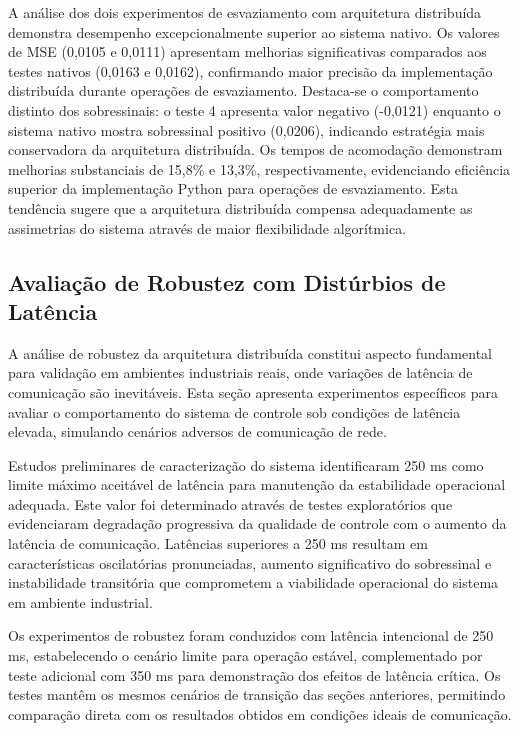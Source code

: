 A análise dos dois experimentos de esvaziamento com arquitetura distribuída demonstra desempenho excepcionalmente superior ao sistema nativo. Os valores de MSE (0,0105 e 0,0111) apresentam melhorias significativas comparados aos testes nativos (0,0163 e 0,0162), confirmando maior precisão da implementação distribuída durante operações de esvaziamento. Destaca-se o comportamento distinto dos sobressinais: o teste 4 apresenta valor negativo (-0,0121) enquanto o sistema nativo mostra sobressinal positivo (0,0206), indicando estratégia mais conservadora da arquitetura distribuída. Os tempos de acomodação demonstram melhorias substanciais de 15,8\% e 13,3\%, respectivamente, evidenciando eficiência superior da implementação Python para operações de esvaziamento. Esta tendência sugere que a arquitetura distribuída compensa adequadamente as assimetrias do sistema através de maior flexibilidade algorítmica.

\subsection{Avaliação de Robustez com Distúrbios de Latência}
\label{sec:fuzzydistribuidolatencia}

A análise de robustez da arquitetura distribuída constitui aspecto fundamental para validação em ambientes industriais reais, onde variações de latência de comunicação são inevitáveis. Esta seção apresenta experimentos específicos para avaliar o comportamento do sistema de controle sob condições de latência elevada, simulando cenários adversos de comunicação de rede.

Estudos preliminares de caracterização do sistema identificaram 250 ms como limite máximo aceitável de latência para manutenção da estabilidade operacional adequada. Este valor foi determinado através de testes exploratórios que evidenciaram degradação progressiva da qualidade de controle com o aumento da latência de comunicação. Latências superiores a 250 ms resultam em características oscilatórias pronunciadas, aumento significativo do sobressinal e instabilidade transitória que comprometem a viabilidade operacional do sistema em ambiente industrial.

Os experimentos de robustez foram conduzidos com latência intencional de 250 ms, estabelecendo o cenário limite para operação estável, complementado por teste adicional com 350 ms para demonstração dos efeitos de latência crítica. Os testes mantêm os mesmos cenários de transição das seções anteriores, permitindo comparação direta com os resultados obtidos em condições ideais de comunicação.

